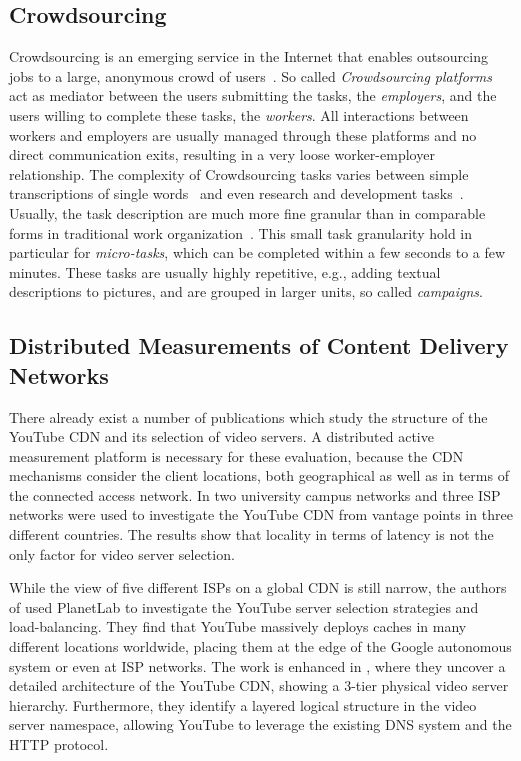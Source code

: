 \subsection{Crowdsourcing}
Crowdsourcing is an emerging service in the Internet that enables outsourcing jobs to a large, anonymous crowd of users~\cite{articles2013-113}.
So called \emph{Crowdsourcing platforms} act as mediator between the users submitting the tasks, the \emph{employers}, and the users willing to complete these tasks, the \emph{workers}.
All interactions between workers and employers are usually managed through these platforms and no direct communication exits, resulting in a very loose worker-employer relationship.
The complexity of Crowdsourcing tasks varies between simple transcriptions of single words~\cite{vonAhn2008} and even research and development tasks~\cite{innocentive}.
Usually, the task description are much more fine granular than in comparable forms in traditional work organization~\cite{conf2011-417}.
This small task granularity hold in particular for \emph{micro-tasks}, which can be completed within a few seconds to a few minutes.
These tasks are usually highly repetitive, e.g., adding textual descriptions to pictures, and are grouped in larger units, so called \emph{campaigns}.

\subsection{Distributed Measurements of Content Delivery Networks}
There already exist a number of publications which study the structure of the YouTube CDN and its selection of video servers.
A distributed active measurement platform is necessary for these evaluation, because the CDN mechanisms consider the client locations, both geographical as well as in terms of the connected access network.
In \cite{torres2011dissecting} two university campus networks and three ISP networks were used to investigate the YouTube CDN from vantage points in three different countries.
The results show that locality in terms of latency is not the only factor for video server selection.

While the view of five different ISPs on a global CDN is still narrow, the authors of \cite{adhikari2011you} used PlanetLab to investigate the YouTube server selection strategies and load-balancing.
They find that YouTube massively deploys caches in many different locations worldwide, placing them at the edge of the Google autonomous system or even at ISP networks.
The work is enhanced in \cite{adhikari2012vivisecting}, where they uncover a detailed architecture of the YouTube CDN, showing a 3-tier physical video server hierarchy.
Furthermore, they identify a layered logical structure in the video server namespace, allowing YouTube to leverage the existing DNS system and the HTTP protocol.

